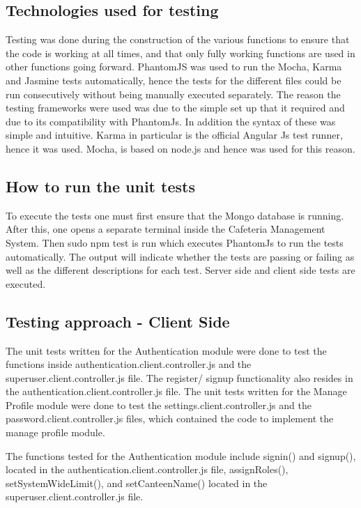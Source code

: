 \documentclass[a4paper,12pt]{article}
\begin{document}
\subsection{Technologies used for testing}
Testing was done during the construction of the various functions to ensure that the code is working at all times, and that only fully working functions are used in other functions going forward. PhantomJS was used to run the Mocha, Karma and Jasmine tests automatically, hence the tests for the different files could be run consecutively without being manually executed separately. The reason the testing frameworks were used was due to the simple set up that it required and due to its compatibility with PhantomJs. In addition the syntax of these was simple and intuitive.  Karma in particular is the official Angular Js test runner, hence it was used. Mocha, is based on node.js and hence was used for this reason. 
\\
\subsection{How to run the unit tests}
To execute the tests one must first ensure that the Mongo database is running. After this, one opens a separate terminal inside the Cafeteria Management System. Then sudo npm test is run which executes PhantomJs to run the tests automatically.  The output will indicate whether the tests are passing or failing as well as the different descriptions for each test. Server side and client side tests are executed.

\subsection{Testing approach - Client Side}
The unit tests written for the Authentication module were done to test the functions inside authentication.client.controller.js and the superuser.client.controller.js file.  The register/ signup functionality also resides in the authentication.client.controller.js file. The unit tests written for the Manage Profile module were done to test the settings.client.controller.js and the password.client.controller.js files, which contained the code to implement the manage profile module.
 
The functions tested for the Authentication module include signin() and signup(), located in the authentication.client.controller.js file, assignRoles(), setSystemWideLimit(), and setCanteenName() located in the  superuser.client.controller.js file.
 
\end{document}
